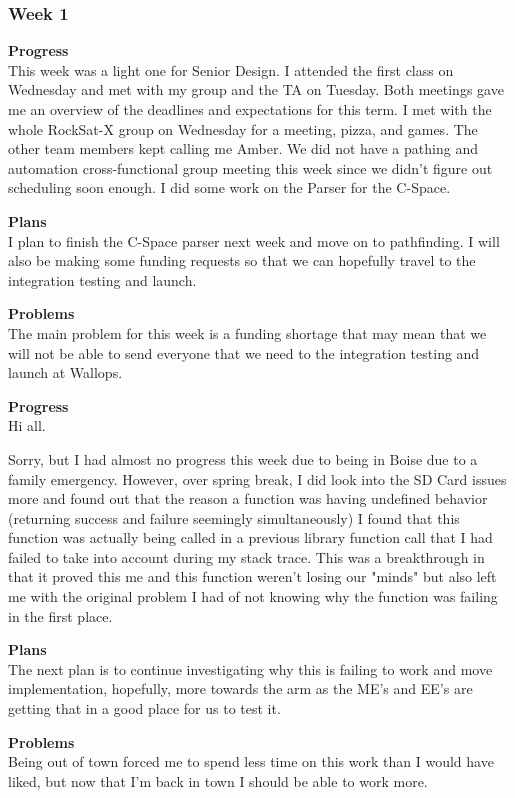 \subsubsection{Week 1}
\textbf{Progress} \\
This week was a light one for Senior Design. I attended the first class on Wednesday and met with my group and the TA on Tuesday. Both meetings gave me an overview of the deadlines and expectations for this term. I met with the whole RockSat-X group on Wednesday for a meeting, pizza, and games. The other team members kept calling me Amber. We did not have a pathing and automation cross-functional group meeting this week since we didn't figure out scheduling soon enough. I did some work on the Parser for the C-Space.

\textbf{Plans} \\ 
I plan to finish the C-Space parser next week and move on to pathfinding. I will also be making some funding requests so that we can hopefully travel to the integration testing and launch.

\textbf{Problems} \\ 
The main problem for this week is a funding shortage that may mean that we will not be able to send everyone that we need to the integration testing and launch at Wallops.

\textbf{Progress} \\
Hi all.

Sorry, but I had almost no progress this week due to being in Boise due to a family emergency. However, over spring break, I did look into the SD Card 
issues more and found out that the reason a function was having undefined behavior (returning success and failure seemingly simultaneously) I found that 
this function was actually being called in a previous library function call that I had failed to take into account during my stack trace. This was a 
breakthrough in that it proved this me and this function weren't losing our "minds" but also left me with the original problem I had of not knowing why 
the function was failing in the first place.

\textbf{Plans} \\
The next plan is to continue investigating why this is failing to work and move implementation, hopefully, more towards the arm as the ME's and EE's are 
getting that in a good place for us to test it.

\textbf{Problems} \\
Being out of town forced me to spend less time on this work than I would have liked, but now that I'm back in town I should be able to work more.

